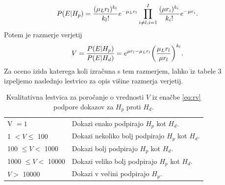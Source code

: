 \documentclass[fin1, tisk]{fmfdelo}
\theoremstyle{definition}
\theoremstyle{trditev}
\theoremstyle{izrek}
\begin{document}
\[
    \vspace{2mm}
    P(E \lvert H_p) = \frac{(\mu _L r_l)^{k_l}}{k_l!}e^{-\mu _L r_l}\prod_{i \neq l, i=1}^{I} \frac{(\mu r_i)^{k_i}}{k_i!}e^{-\mu r_i}.\vspace{2mm}
\]
Potem je razmerje verjetij
\begin{equation}\label{eq:rv}
    V = \frac{P(E \lvert H_p)}{P(E \lvert H_d)} = e^{\mu r_l-\mu _L r_l}\biggl(\frac{\mu _L r_l}{\mu r_l}\biggr)^{k_l}.\vspace{2mm}
\end{equation}
Za oceno izida katerega koli izračuna s tem razmerjem, lahko iz tabele 3 izpeljemo naslednjo lestvico za opis višine razmerja verjetij.
\begin{table}[h!]
    \centering
    \caption{Kvalitativna lestvica za poročanje o vrednosti $V$ iz enačbe \eqref{eq:rv} podpore dokazov za $H_p$ proti $H_d$. \vspace{2mm}}
    \label{table:1}
     \begin{tabular}{l l}
        \hline
        V $= 1$ & Dokazi enako podpirajo $H_p$ kot $H_d$. \\
        1  $< V \le$  100 & Dokazi nekoliko bolj podpirajo $H_p$ kot $H_d$. \\
        100  $\le V <$  1000 & Dokazi bolj podpirajo $H_p$ kot $H_d$. \\
        1000  $\le V <$  10000 & Dokazi veliko bolj podpirajo $H_p$ kot $H_d$. \\
        $V >$ 10000 & Dokazi v večini podpirajo $H_p$. \\ [1ex]
        \hline
     \end{tabular}
 \end{table} 

\end{document}

